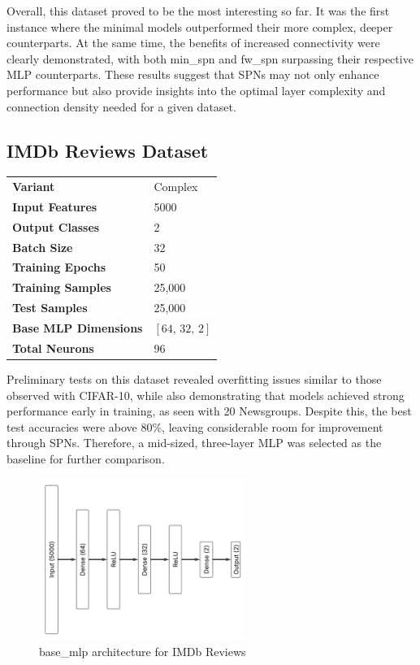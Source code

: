 Overall, this dataset proved to be the most interesting so far. It was the first instance where the minimal models outperformed their more complex, deeper counterparts. At the same time, the benefits of increased connectivity were clearly demonstrated, with both min\_spn and fw\_spn surpassing their respective MLP counterparts. These results suggest that SPNs may not only enhance performance but also provide insights into the optimal layer complexity and connection density needed for a given dataset.

\subsection{IMDb Reviews Dataset}

\begin{tabular}{@{}ll@{}}
\textbf{Variant} & Complex \\
\textbf{Input Features} & 5000 \\
\textbf{Output Classes} & 2 \\
\textbf{Batch Size} & 32 \\
\textbf{Training Epochs} & 50 \\
\textbf{Training Samples} & 25,000 \\
\textbf{Test Samples} & 25,000 \\
\textbf{Base MLP Dimensions} & $[64,\, 32,\, 2]$ \\
\textbf{Total Neurons} & 96 \\
\end{tabular}

\vspace{2pt}
Preliminary tests on this dataset revealed overfitting issues similar to those observed with CIFAR-10, while also demonstrating that models achieved strong performance early in training, as seen with 20 Newsgroups. Despite this, the best test accuracies were above 80\%, leaving considerable room for improvement through SPNs. Therefore, a mid-sized, three-layer MLP was selected as the baseline for further comparison.

\begin{figure}[H]
    \centering
    \includegraphics[height=0.28\textheight,width=0.6\textwidth]{Figures/Results/IMDB/IMDB_base_mlp_architecture.png} 
    \captionsetup{justification=centering}  %
    \caption{base\_mlp architecture for IMDb Reviews}
    \label{fig:imdbMlpBaseArch}
\end{figure}

